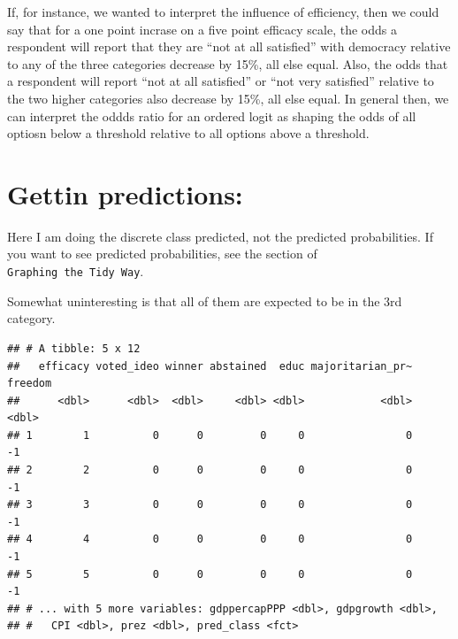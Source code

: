 \documentclass[]{book}
\newenvironment{Shaded}{\begin{snugshade}}{\end{snugshade}}
\newcommand{\KeywordTok}[1]{\textcolor[rgb]{0.13,0.29,0.53}{\textbf{#1}}}
\newcommand{\DataTypeTok}[1]{\textcolor[rgb]{0.13,0.29,0.53}{#1}}
\newcommand{\StringTok}[1]{\textcolor[rgb]{0.31,0.60,0.02}{#1}}
\newcommand{\OperatorTok}[1]{\textcolor[rgb]{0.81,0.36,0.00}{\textbf{#1}}}
\newcommand{\NormalTok}[1]{#1}
\begin{document}
If, for instance, we wanted to interpret the influence of efficiency,
then we could say that for a one point incrase on a five point efficacy
scale, the odds a respondent will report that they are ``not at all
satisfied'' with democracy relative to any of the three categories
decrease by 15\%, all else equal. Also, the odds that a respondent will
report ``not at all satisfied'' or ``not very satisfied'' relative to
the two higher categories also decrease by 15\%, all else equal. In
general then, we can interpret the oddds ratio for an ordered logit as
shaping the odds of all optiosn below a threshold relative to all
options above a threshold.

\section{Gettin predictions:}\label{gettin-predictions}

Here I am doing the discrete class predicted, not the predicted
probabilities. If you want to see predicted probabilities, see the
section of \texttt{Graphing\ the\ Tidy\ Way}.

Somewhat uninteresting is that all of them are expected to be in the 3rd
category.

\begin{Shaded}
\end{Shaded}

\begin{verbatim}
## # A tibble: 5 x 12
##   efficacy voted_ideo winner abstained  educ majoritarian_pr~ freedom
##      <dbl>      <dbl>  <dbl>     <dbl> <dbl>            <dbl>   <dbl>
## 1        1          0      0         0     0                0      -1
## 2        2          0      0         0     0                0      -1
## 3        3          0      0         0     0                0      -1
## 4        4          0      0         0     0                0      -1
## 5        5          0      0         0     0                0      -1
## # ... with 5 more variables: gdppercapPPP <dbl>, gdpgrowth <dbl>,
## #   CPI <dbl>, prez <dbl>, pred_class <fct>
\end{verbatim}
\end{document}
